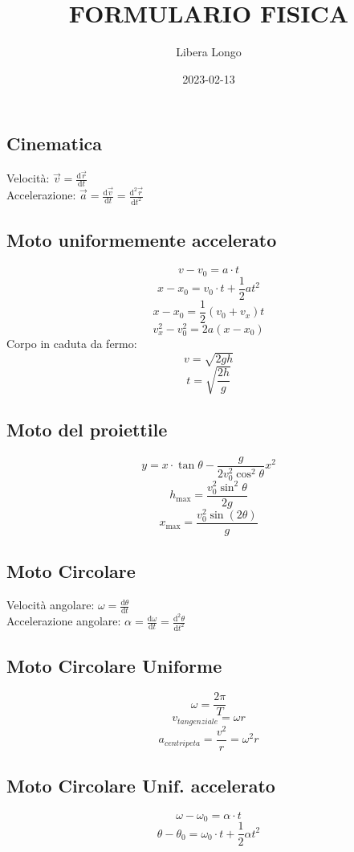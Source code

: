 \documentclass{article}
\title{FORMULARIO FISICA}
\date{2023-02-13}
\author{Libera Longo}
\begin{document}
	\begin{small}
	\begin{multicols}{3}
\section{Cinematica}
		Velocità: $ \vec v = \frac{ \mathrm d \vec r }{ \mathrm d t } $ \\
		Accelerazione: $ \vec a = \frac{ \mathrm d \vec v }{ \mathrm d t } = \frac{ \mathrm d^2 \vec r }{ \mathrm d t^2 } $
	\subsection{Moto uniformemente accelerato}
		\[ v - v_0 = a \cdot t \]
		\[ x - x_0 = v_0 \cdot t + \frac{1}{2} a t^2 \]
		\[ x - x_0 = \frac{1}{2} (v_0 + v_x) t \]
		\[ v_x^2 - v_0^2 = 2 a (x - x_0) \]
		Corpo in caduta da fermo:
		\[ v = \sqrt{ 2 g h } \]
		\[ t = \sqrt{ \frac{ 2h }{ g } } \]
	\subsection{Moto del proiettile}
		\[ y = x \cdot \tan \theta - \frac{ g }{ 2 v_0^2 \cos^2 \theta } x^2 \]
		\[ h_{\max} = \frac{ v_0^2 \sin^2 \theta }{ 2 g } \]
		\[ x_{\max} = \frac{ v_0^2 \sin( 2 \theta ) }{ g } \]
	\subsection{Moto Circolare}
		Velocità angolare: $ \omega = \frac{ \mathrm d \theta }{ \mathrm d t } $ \\
		Accelerazione angolare: $ \alpha = \frac{ \mathrm d \omega }{ \mathrm d t } = \frac { \mathrm d^2 \theta }{ \mathrm d t^2 } $
	\subsection{Moto Circolare Uniforme}
		\[ \omega = \frac{ 2 \pi }{ T } \]
		\[ v_{tangenziale} = \omega r \]
		\[ a_{centripeta} = \frac{ v^2 }{ r } = \omega^2 r \]
	\subsection{Moto Circolare Unif. accelerato}
		\[ \omega - \omega_0 = \alpha \cdot t \]
		\[ \theta - \theta_0 = \omega_0 \cdot t + \frac{1}{2} \alpha t^2 \]

\end{multicols}
\end{small}
\end{document}
